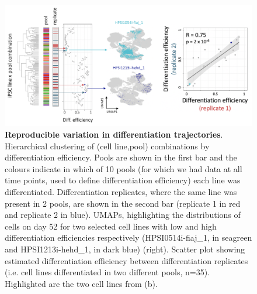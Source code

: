 \begin{figure}[h]
\centering
\includegraphics[width=15cm]{Chapter5/Fig/neuroseq_diff_eff_replication.png}
\caption[Reproducible differentiation efficiency]{\textbf{Reproducible variation in differentiation trajectories}.\\
Hierarchical clustering of (cell line,pool) combinations by differentiation efficiency. 
Pools are shown in the first bar and the colours indicate in which of 10 pools (for which we had data at all time points, used to define differentiation efficiency) each line was differentiated. Differentiation replicates, where the same line was present in 2 pools, are shown in the second bar (replicate 1 in red and replicate 2 in blue).
UMAPs, highlighting the distributions of cells on day 52 for two selected cell lines with low and high differentiation efficiencies respectively (HPSI0514i-fiaj\_1, in seagreen and HPSI1213i-hehd\_1, in dark blue) (right).
Scatter plot showing estimated differentiation efficiency between differentiation replicates (i.e. cell lines differentiated in two different pools, n=35). 
Highlighted are the two cell lines from (b).}
\label{fig:neuroseq_diff_eff_replication}
\end{figure}

